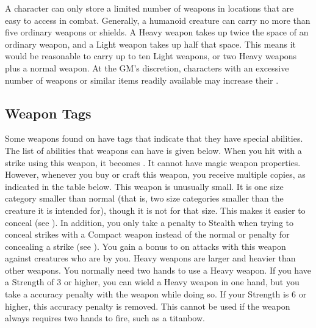         A character can only store a limited number of weapons in locations that are easy to access in combat.
        Generally, a humanoid creature can carry no more than five ordinary weapons or shields.
        A Heavy weapon takes up twice the space of an ordinary weapon, and a Light weapon takes up half that space.
        This means it would be reasonable to carry up to ten Light weapons, or two Heavy weapons plus a normal weapon.
        At the GM's discretion, characters with an excessive number of weapons or similar items readily available may increase their .

    \subsection{Weapon Tags}\label{Weapon Tags}
        Some weapons found on  have tags that indicate that they have special abilities. The list of abilities that weapons can have is given below.
         When you hit with a strike using this weapon, it becomes .
        It cannot have magic weapon properties.
        However, whenever you buy or craft this weapon, you receive multiple copies, as indicated in the table below.
         This weapon is unusually small.
        It is one size category smaller than normal (that is, two size categories smaller than the creature it is intended for), though it is not  for that size.
        This makes it easier to conceal (see ).
        In addition, you only take a  penalty to Stealth when trying to conceal strikes with a Compact weapon instead of the normal  or  penalty for concealing a strike (see ).
         You gain a  bonus to  on  attacks with this weapon against creatures who are \grappled by you.
         Heavy weapons are larger and heavier than other weapons.
        You normally need two hands to use a Heavy weapon.
        If you have a Strength of 3 or higher, you can wield a Heavy weapon in one hand, but you take a  accuracy penalty with the weapon while doing so.
        If your Strength is 6 or higher, this accuracy penalty is removed.
        This cannot be used if the weapon always requires two hands to fire, such as a titanbow.

